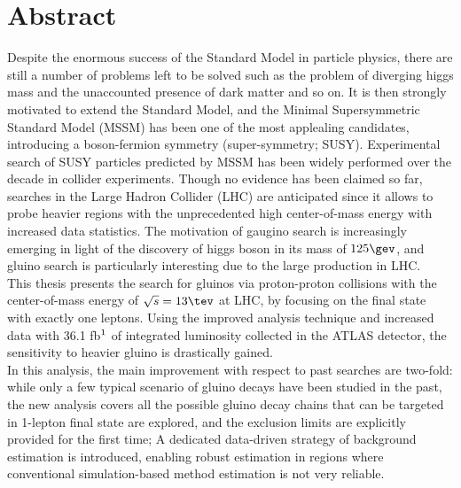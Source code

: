 \setlength{\topmargin}{-1.5cm}
\setlength{\oddsidemargin}{-0.3cm}
\setlength{\evensidemargin}{-0.3cm}
\setlength{\textwidth}{16.5cm}
\setlength{\textheight}{23cm}



%

\section*{Abstract} 
Despite the enormous success of the Standard Model in particle physics, there are still a number of problems left to be solved such as the problem of diverging higgs mass and the unaccounted presence of dark matter and so on.
It is then strongly motivated to extend the Standard Model, and the Minimal Supersymmetric Standard Model (MSSM) has been one of the most applealing candidates, introducing a boson-fermion symmetry (super-symmetry; SUSY). 
Experimental search of SUSY particles predicted by MSSM has been widely performed over the decade in collider experiments. Though no evidence has been claimed so far, searches in the Large Hadron Collider (LHC) are anticipated since it allows to probe heavier regions with the unprecedented high center-of-mass energy with increased data statistics.
The motivation of gaugino search is increasingly emerging in light of the discovery of higgs boson in its mass of $125\gev$, and gluino search is particularly interesting due to the large production in LHC.   \\

This thesis presents the search for gluinos via proton-proton collisions with the center-of-mass energy of $\sqrt{s}=13\tev$ at LHC, by focusing on the final state with exactly one leptons. 
Using the improved analysis technique and increased data with 36.1 fb$^{\-1}$ of integrated luminosity collected in the ATLAS detector, the sensitivity to heavier gluino is drastically gained.  \\

In this analysis, the main improvement with respect to past searches are two-fold: 
while only a few typical scenario of gluino decays have been studied in the past, 
the new analysis covers all the possible gluino decay chains that can be targeted in 1-lepton final state are explored, 
and the exclusion limits are explicitly provided for the first time; 
A dedicated data-driven strategy of background estimation is introduced, enabling robust estimation in regions where conventional simulation-based method estimation is not very reliable. \\

